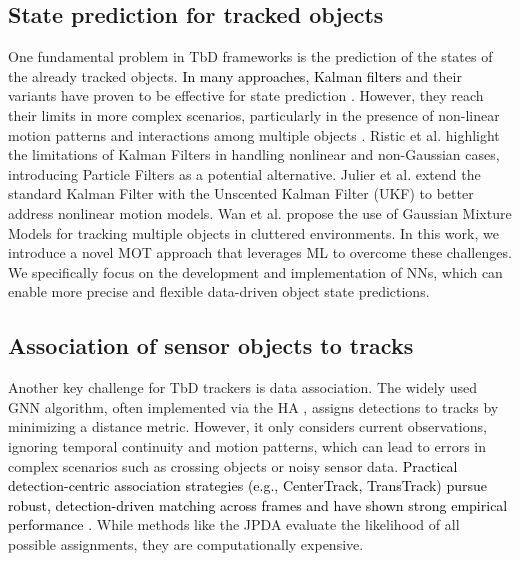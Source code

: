 \documentclass[letterpaper, 10 pt, journal, twoside]{IEEEtran}
\newcommand{\red}[1]{\textcolor{black}{#1}}
\begin{document}
\subsection{State prediction for tracked objects}
One fundamental problem in \ac{TbD} frameworks is the prediction of the states of the already tracked objects.
\red{In many approaches, Kalman filters} and their variants have proven to be effective for state prediction {\cite{KF_simple_cues.2022, KF_Bewley.2016, KF_framework.2013}}.
However, they reach their limits in more complex scenarios, particularly in the presence of non-linear motion patterns and interactions among multiple objects {\cite{KF_Ristic.2004,KF_Julier.2004,KF_Wan.2000}}.
Ristic et al. {\cite{KF_Ristic.2004}} highlight the limitations of Kalman Filters in handling nonlinear and non-Gaussian cases, introducing Particle Filters as a potential alternative.
Julier et al. {\cite{KF_Julier.2004}} extend the standard Kalman Filter with the Unscented Kalman Filter (UKF) to better address nonlinear motion models.
Wan et al. {\cite{KF_Wan.2000}} propose the use of Gaussian Mixture Models for tracking multiple objects in cluttered environments.
In this work, we introduce a novel \ac{MOT} approach that leverages \ac{ML} to overcome these challenges.
We specifically focus on the development and implementation of \acp{NN}, which can enable more precise and flexible data-driven object state predictions.

\subsection{Association of sensor objects to tracks}
Another key challenge for TbD trackers is data association.
The widely used \ac{GNN} algorithm, often implemented via the \ac{HA} {\cite{DA_hungarian.1955}}, assigns detections to tracks by minimizing a distance metric.
However, it only considers current observations, ignoring temporal continuity and motion patterns, which can lead to errors in complex scenarios such as crossing objects or noisy sensor data.
\red{Practical detection-centric association strategies (e.g., CenterTrack, TransTrack) pursue robust, detection-driven matching across frames and have shown strong empirical performance {\cite{Zhou2020CenterTrack,Sun2020TransTrack}}.}
While methods like the \ac{JPDA} {\cite{DA_JPDA.1993}} evaluate the likelihood of all possible assignments, they are computationally expensive.
\end{document}
